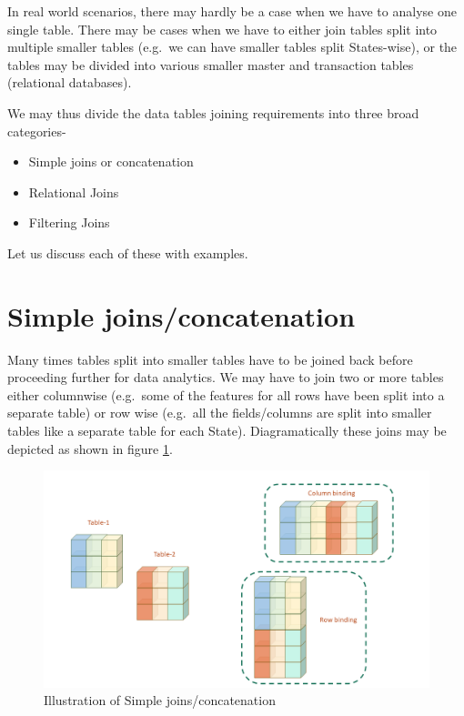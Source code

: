 \documentclass[
]{book}
\providecommand{\tightlist}{%
  \setlength{\itemsep}{0pt}\setlength{\parskip}{0pt}}
\begin{document}
In real world scenarios, there may hardly be a case when we have to analyse one single table. There may be cases when we have to either join tables split into multiple smaller tables (e.g.~we can have smaller tables split States-wise), or the tables may be divided into various smaller master and transaction tables (relational databases).

We may thus divide the data tables joining requirements into three broad categories-

\begin{itemize}
\tightlist
\item
  Simple joins or concatenation
\item
  Relational Joins
\item
  Filtering Joins
\end{itemize}

Let us discuss each of these with examples.

\hypertarget{simple-joinsconcatenation}{%
\section{Simple joins/concatenation}\label{simple-joinsconcatenation}}

Many times tables split into smaller tables have to be joined back before proceeding further for data analytics. We may have to join two or more tables either columnwise (e.g.~some of the features for all rows have been split into a separate table) or row wise (e.g.~all the fields/columns are split into smaller tables like a separate table for each State). Diagramatically these joins may be depicted as shown in figure \ref{fig:joins}.

\begin{figure}

{\centering \includegraphics[width=0.99\linewidth]{images/concat_joins} 

}

\caption{Illustration of Simple joins/concatenation}\label{fig:joins}
\end{figure}
\end{document}

